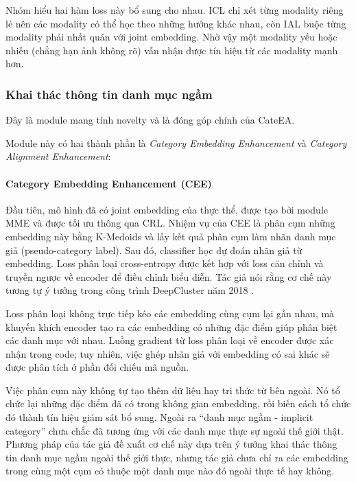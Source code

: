 Nhóm hiểu hai hàm loss này bổ sung cho nhau. ICL chỉ xét từng modality riêng lẻ nên các modality có thể học theo những hướng khác nhau, còn IAL buộc từng modality phải nhất quán với joint embedding. Nhờ vậy một modality yếu hoặc nhiễu (chẳng hạn ảnh không rõ) vẫn nhận được tín hiệu từ các modality mạnh hơn.

\subsubsection{Khai thác thông tin danh mục ngầm}

Đây là module mang tính novelty và là đóng góp chính của CateEA.

Module này có hai thành phần là \textit{Category Embedding Enhancement} và \textit{Category Alignment Enhancement}:

\paragraph{Category Embedding Enhancement (CEE)}


Đầu tiên, mô hình đã có joint embedding của thực thể, được tạo bởi module MME và được tối ưu thông qua CRL. Nhiệm vụ của CEE là phân cụm những embedding này bằng K-Medoids và lấy kết quả phân cụm làm nhãn danh mục giả (pseudo-category label). Sau đó, classifier học dự đoán nhãn giả từ embedding. Loss phân loại cross-entropy được kết hợp với loss căn chỉnh và truyền ngược về encoder để điều chỉnh biểu diễn. Tác giả nói rằng cơ chế này tương tự ý tưởng trong công trình DeepCluster năm 2018 \cite{caron2018deepcluster}.

Loss phân loại không trực tiếp kéo các embedding cùng cụm lại gần nhau, mà khuyến khích encoder tạo ra các embedding có những đặc điểm giúp phân biệt các danh mục với nhau. Luồng gradient từ loss phân loại về encoder được xác nhận trong code; tuy nhiên, việc ghép nhãn giả với embedding có sai khác sẽ được phân tích ở phần đối chiếu mã nguồn.

Việc phân cụm này không tự tạo thêm dữ liệu hay tri thức từ bên ngoài. Nó tổ chức lại những đặc điểm đã có trong không gian embedding, rồi biến cách tổ chức đó thành tín hiệu giám sát bổ sung. Ngoài ra ``danh mục ngầm - implicit category'' chưa chắc đã tương ứng với các danh mục thực sự ngoài thế giới thật. Phương pháp của tác giả đề xuất cơ chế này dựa trên ý tưởng khai thác thông tin danh mục ngầm ngoài thế giới thực, nhưng tác giả chưa chỉ ra các embedding trong cùng một cụm có thuộc một danh mục nào đó ngoài thực tế hay không.


